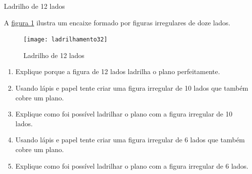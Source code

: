 \begin{task}{Ladrilho de 12 lados}

A \hyperref[12lados]{figura \ref{12lados}} ilustra um encaixe formado por figuras irregulares de doze lados. 

	\begin{figure}[H]
	\centering
	\texttt{[image: ladrilhamento32]}
	\caption{Ladrilho de 12 lados}
	\label{12lados}
	\end{figure}
	
	\begin{enumerate}
		\item Explique porque a figura de 12 lados ladrilha o plano perfeitamente.
		\item Usando lápis e papel tente criar uma figura irregular de 10 lados que também cobre um plano.
		\item Explique como foi possível ladrilhar o plano com a figura irregular de 10 lados.
		\item Usando lápis e papel tente criar uma figura irregular de 6 lados que também cobre um plano.
		\item Explique como foi possível ladrilhar o plano com a figura irregular de 6 lados.
	\end{enumerate}
	
\end{task}


\exercise

